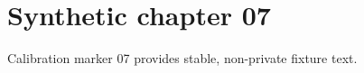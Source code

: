 \chapter{Synthetic chapter 07}\label{chap:07}
Calibration marker 07 provides stable, non-private fixture text.
